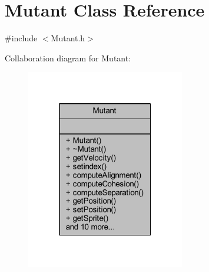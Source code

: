 \hypertarget{class_mutant}{}\section{Mutant Class Reference}
\label{class_mutant}


{\ttfamily \#include $<$Mutant.\+h$>$}



Collaboration diagram for Mutant\+:
\nopagebreak
\begin{figure}[H]
\begin{center}
\leavevmode
\includegraphics[width=196pt]{class_mutant__coll__graph}
\end{center}
\end{figure}
